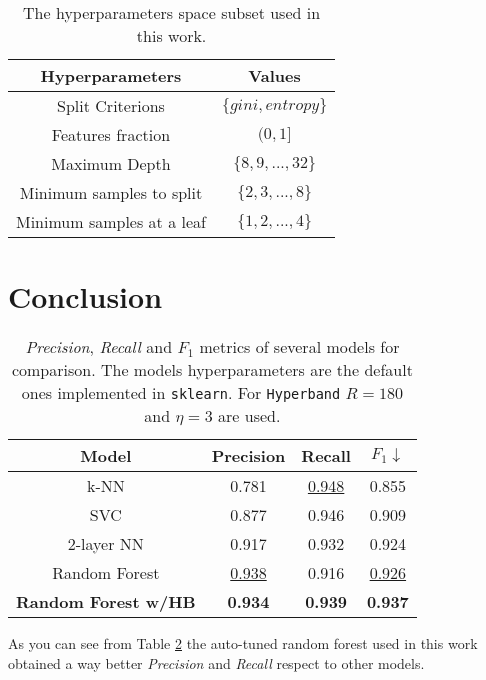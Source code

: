 \documentclass[11pt, a4paper]{article}
\begin{document}
  \begin{table}
    \centering
    \begin{tabular}{|c c|}
      \hline
      Hyperparameters & Values \\
      \hline\hline
      Split Criterions & $\{gini, entropy\}$ \\
      \hline
      Features fraction & $(0, 1]$ \\
      \hline
      Maximum Depth & $\{8,9,...,32\}$ \\
      \hline
      Minimum samples to split & $\{2,3,...,8\}$ \\
      \hline
      Minimum samples at a leaf & $\{1,2,...,4\}$ \\
      \hline
    \end{tabular}
    \caption{The hyperparameters space subset used in this work.}
    \label{table:hyperparameters}
  \end{table}

\section{Conclusion}
\begin{table}
  \centering
  \begin{tabular}{|c c c c|}
    \hline
    Model & Precision & Recall & $F_{1} \downarrow$  \\
    \hline\hline
    k-NN & 0.781 & \underline{0.948} & 0.855 \\
    \hline
    SVC & 0.877 & 0.946 & 0.909 \\
    \hline
    2-layer NN & 0.917 & 0.932 & 0.924 \\
    \hline
    Random Forest & \underline{0.938} & 0.916 & \underline{0.926} \\
    \hline
    \textbf{Random Forest w/HB} & \textbf{0.934} & \textbf{0.939} & \textbf{0.937} \\
    \hline
  \end{tabular}
  \caption{\textit{Precision}, \textit{Recall} and $F_{1}$ metrics of several models for comparison. The models hyperparameters are the default ones implemented in \texttt{sklearn}. For \texttt{Hyperband} $R=180$ and $\eta=3$ are used.}
  \label{table:benchmark}
\end{table}

  As you can see from Table \ref{table:benchmark} the auto-tuned random forest used in this work obtained a way better \textit{Precision} and \textit{Recall} respect to other models.
\end{document}
